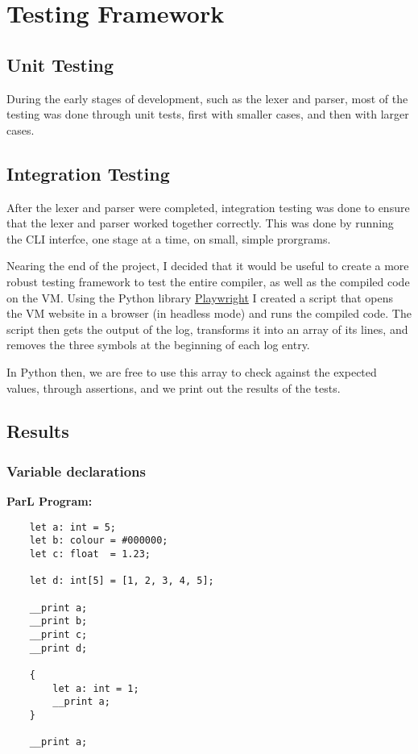 \section{Testing Framework}

\subsection{Unit Testing}

During the early stages of development, such as the lexer and parser, most of
the testing was done through unit tests, first with smaller cases, and then with
larger cases.

\subsection{Integration Testing}

After the lexer and parser were completed, integration testing was done to
ensure that the lexer and parser worked together correctly. This was done by
running the CLI interfce, one stage at a time, on small, simple prorgrams.

Nearing the end of the project, I decided that it would be useful to create a
more robust testing framework to test the entire compiler, as well as the
compiled code on the VM. Using the Python library
\href{https://playwright.dev/python/}{Playwright} I created a script that opens
the VM website in a browser (in headless mode) and runs the compiled code. The
script then gets the output of the log, transforms it into an array of its
lines, and removes the three  symbols at the beginning of each log
entry.

In Python then, we are free to use this array to check against the expected
values, through assertions, and we print out the results of the tests.



\subsection{Results}

\subsubsection{Variable declarations}

\textbf{ParL Program:}

\begin{lstlisting}
    let a: int = 5;
    let b: colour = #000000;
    let c: float  = 1.23;

    let d: int[5] = [1, 2, 3, 4, 5];

    __print a;
    __print b;
    __print c;
    __print d;

    {
        let a: int = 1;
        __print a;
    }

    __print a;
\end{lstlisting}

